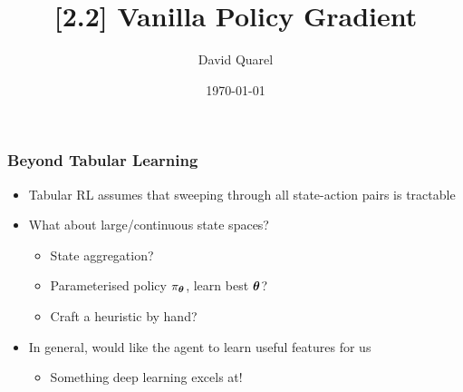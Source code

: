 


\newcommand{\R}{\mathcal{R}}
\renewcommand{\S}{\mathcal{S}}
\newcommand{\A}{\mathcal{A}}
\renewcommand{\Pr}{\text{Pr}}
\renewcommand{\P}{\text{P}}
\newcommand{\iter}{\xrightarrow{I}}
\newcommand{\eval}{\xrightarrow{E}}
\newcommand{\iver}[1]{\llbracket {#1} \rrbracket}
\newcommand{\biject}{\langle \cdot \rangle}
\newcommand{\bij}[1]{\langle {#1} \rangle}
\newcommand{\pth}{{\boldsymbol{\phi}}}
\newcommand{\eps}{\epsilon}
\newcommand{\eplen}{T}
\newcommand{\env}{\mu}
\algnewcommand{}
\algnewcommand\Input{\item[\algorithmicinput]}
\algnewcommand{}
\algnewcommand\Output{\item[\algorithmicoutput]}
\algnewcommand{}
\algnewcommand\Effect{\item[\algorithmiceffect]}





\title[{[2.2] Vanilla Policy Gradient}]
{{[2.2] Vanilla Policy Gradient}}

 
\author[David Quarel] %
{David Quarel}
 
 
\date[\today] %
{\today}
 
\frame{\titlepage}


\begin{frame}
	\frametitle{Beyond Tabular Learning}
	
\begin{itemize}
	\item Tabular RL assumes that sweeping through
	all state-action pairs is tractable
	\pause
	\item What about large/continuous state spaces?
	\begin{itemize}
		\item State aggregation?
		\item Parameterised policy $\pi_{\boldsymbol{\theta}}$, learn best ${\boldsymbol{\theta}}$?
		\item Craft a heuristic by hand?
	\end{itemize}
	\item In general, would like the agent to learn useful features for us
	\pause
	\begin{itemize}
		\item Something deep learning excels at!
	\end{itemize}
\end{itemize}
\end{frame}

